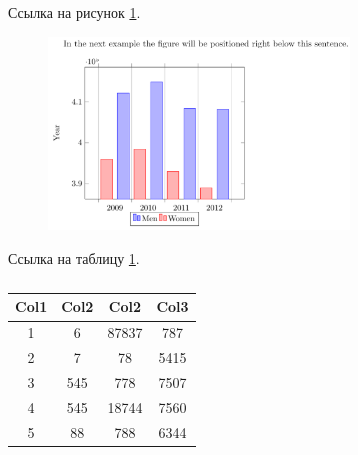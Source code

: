\documentclass[xelatex,big]{G7-32-2017}
\begin{document}
\lipsum

Ссылка на рисунок \ref{ex:fig:1}.
\begin{figure}[h]
    \centering
    \includegraphics[width=8cm]{[NAME]/Plot}
    \caption{\lipsum[6][4-5]}
    \label{ex:fig:1}
\end{figure}

Ссылка на таблицу \ref{ex:tb:1}.
\begin{table}[h]
    \centering
    \caption{\lipsum[3][3-5]}
    \label{ex:tb:1}
    \begin{tabular}{| c | c | c | c |}
        \hline
        Col1 & Col2 & Col2 & Col3 \\
        \hline
        1 & 6 & 87837 & 787 \\
        \hline 
        2 & 7 & 78 & 5415 \\
        \hline
        3 & 545 & 778 & 7507 \\
        \hline
        4 & 545 & 18744 & 7560 \\
        \hline
        5 & 88 & 788 & 6344 \\
        \hline
    \end{tabular}
\end{table}
\end{document}
